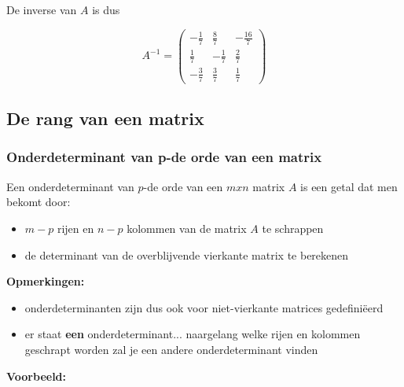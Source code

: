 De inverse van $A$ is dus

\[ A^{-1}= \left( \begin{matrix}
-\frac{1}{7} & \frac{8}{7} & -\frac{16}{7} \\
\frac{1}{7} & -\frac{1}{7} & \frac{2}{7} \\
-\frac{3}{7} & \frac{3}{7} & \frac{1}{7}
\end{matrix}   \right)
\]

\subsection{De rang van een matrix}

\subsubsection{Onderdeterminant van p-de orde van een matrix}

Een onderdeterminant van $p$-de orde van een $mxn$ matrix $A$ is een getal dat men bekomt door:
\begin{itemize}
	\item $m-p$ rijen en $n-p$ kolommen van de matrix $A$ te schrappen
	\item de determinant van de overblijvende vierkante matrix te berekenen
\end{itemize}

{\bf Opmerkingen:}

\begin{itemize}
	\item onderdeterminanten zijn dus ook voor niet-vierkante matrices gedefini\"{e}erd
	\item er staat {\bf een} onderdeterminant... naargelang welke rijen en kolommen geschrapt worden zal je een andere onderdeterminant vinden
\end{itemize}

{\bf Voorbeeld:}


